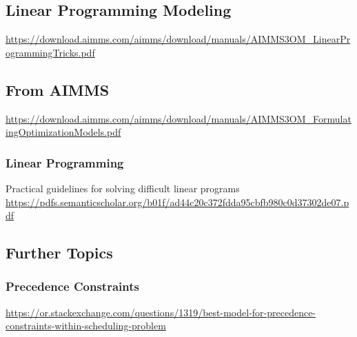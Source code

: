 \documentclass[../open-optimization/open-optimization.tex]{subfiles}
\begin{document}
\subsection{Linear Programming Modeling}
\url{https://download.aimms.com/aimms/download/manuals/AIMMS3OM_LinearProgrammingTricks.pdf}

\subsection{From AIMMS}
 \url{https://download.aimms.com/aimms/download/manuals/AIMMS3OM_FormulatingOptimizationModels.pdf}

\subsubsection{Linear Programming}
Practical guidelines for solving difficult linear programs
\url{https://pdfs.semanticscholar.org/b01f/ad44c20c372fdda95cbfb980c0d37302de07.pdf}

\subsection{Further Topics}

\subsubsection{Precedence Constraints}
\url{https://or.stackexchange.com/questions/1319/best-model-for-precedence-constraints-within-scheduling-problem}
\end{document}
